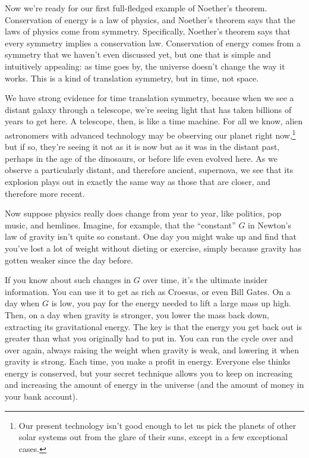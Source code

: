 %
\label{sec:noether-energy}
Now we're ready for our first full-fledged example of Noether's theorem.
Conservation of energy is a law of physics, and Noether's theorem
says that the laws of physics come from symmetry. Specifically, Noether's
theorem says that every symmetry implies a conservation law. Conservation
of energy comes from a symmetry that we haven't even discussed yet, but one that
is simple and intuitively appealing: as time goes by, the universe doesn't
change the way it works. This is a kind of translation symmetry, but in time,
not space.

We have strong evidence for time translation symmetry, because when
we see a distant galaxy through a telescope, we're seeing light that has taken
billions of years to get here. A telescope, then, is like a time machine. For all
we know, alien astronomers with advanced technology may be observing our planet
right now,\footnote{Our present technology isn't good enough to let us pick
the planets of other solar systems out from the glare of their suns, except in a few
exceptional cases.}
but if so, they're seeing it not as it is now but as it
was in the distant past, perhaps in the age of the dinosaurs, or before life
even evolved here. As we observe a particularly distant, and therefore ancient,
supernova, we see that its explosion plays out in exactly the same way as
those that are closer, and therefore more recent.

Now suppose physics really does change from year to year, like politics, pop music,
and hemlines. Imagine, for example, that the ``constant'' $G$ in Newton's
law of gravity isn't quite so constant. One day you might wake up and find that you've
lost a lot of weight without dieting or exercise, simply because gravity has gotten
weaker since the day before. 

If you know about such changes in $G$ over time, it's the ultimate insider
information. You can use it to get as rich as Croesus, or even Bill Gates.
On a day when $G$ is low, you pay for the energy needed to lift
a large mass up high. Then, on a day when gravity is stronger,
you lower the mass back down, extracting its gravitational energy.
The key is that the energy you get back out is greater than what you
originally had to put in. You can run the cycle over and over again, always
raising the weight when gravity is weak, and lowering it when gravity is strong.
Each time, you make a profit in energy. Everyone else thinks energy is conserved,
but your secret technique allows you to keep on increasing and increasing the amount
of energy in the universe (and the amount of money in your bank account).

